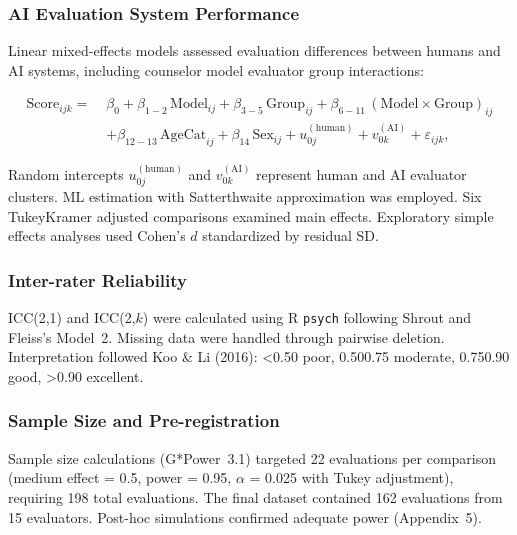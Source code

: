 \documentclass{wiley-article}
\begin{document}
\subsubsection*{AI Evaluation System Performance}

Linear mixed-effects models assessed evaluation differences between humans and AI systems, including counselor model \texttimes{} evaluator group interactions:

\begin{equation}
\begin{aligned}
\mathrm{Score}_{ijk} =\;&
\beta_{0}
+\beta_{1-2}\,\mathrm{Model}_{ij}
+\beta_{3-5}\,\mathrm{Group}_{ij}
+\beta_{6-11}\,(\mathrm{Model}\times\mathrm{Group})_{ij}\\
&+\beta_{12-13}\,\mathrm{AgeCat}_{ij}
+\beta_{14}\,\mathrm{Sex}_{ij}
+u^{(\mathrm{human})}_{0j}
+v^{(\mathrm{AI})}_{0k}
+\varepsilon_{ijk},
\end{aligned}
\end{equation}

Random intercepts $u^{(\mathrm{human})}_{0j}$ and $v^{(\mathrm{AI})}_{0k}$ represent human and AI evaluator clusters. ML estimation with Satterthwaite approximation was employed. Six Tukey\textendash{}Kramer adjusted comparisons examined main effects. Exploratory simple effects analyses used Cohen's $d$ standardized by residual SD.

\subsubsection*{Inter-rater Reliability}

ICC(2,1) and ICC(2,$k$) were calculated using \textsf{R} \texttt{psych} following Shrout and Fleiss's Model~2. Missing data were handled through pairwise deletion. Interpretation followed Koo \& Li (2016): <0.50 poor, 0.50\textendash{}0.75 moderate, 0.75\textendash{}0.90 good, >0.90 excellent.

\subsubsection*{Sample Size and Pre-registration}

Sample size calculations (\textsf{G*Power}~3.1) targeted 22 evaluations per comparison (medium effect = 0.5, power = 0.95, $\alpha$ = 0.025 with Tukey adjustment), requiring 198 total evaluations. The final dataset contained 162 evaluations from 15 evaluators. Post-hoc simulations confirmed adequate power (Appendix~5). 
\end{document}
